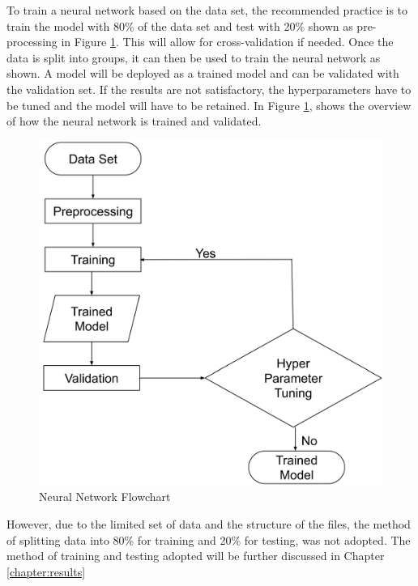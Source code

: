 \documentclass{tum-book}
\begin{document}
        \bigskip\noindent
        To train a neural network based on the data set, the recommended practice is to train the model with 80\% of the data set and test with 20\% shown as pre-processing in Figure \ref{fig: Neural Network Flowchart}. This will allow for cross-validation if needed. Once the data is split into groups, it can then be used to train the neural network as shown. A model will be deployed as a trained model and can be validated with the validation set. If the results are not satisfactory, the hyperparameters have to be tuned and the model will have to be retained. In Figure \ref{fig: Neural Network Flowchart}, shows  the overview of how the neural network is trained and validated.
        
        \bigskip\begin{figure}[h]
            \centering
            \includegraphics[scale=0.4]{myFiles/myImages/Neural_Network_Flowchart.png}
            \caption{Neural Network Flowchart}
            \label{fig: Neural Network Flowchart}
        \end{figure}
        
        \noindent
        However, due to the limited set of data and the structure of the files, the method of splitting data into 80\% for training and 20\% for testing, was not adopted. The method of training and testing adopted will be further discussed in Chapter \ref{chapter:results}
\end{document}
